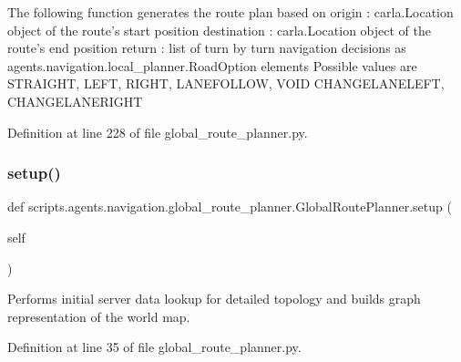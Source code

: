 \begin{DoxyVerb}The following function generates the route plan based on
origin      : carla.Location object of the route's start position
destination : carla.Location object of the route's end position
return      : list of turn by turn navigation decisions as
agents.navigation.local_planner.RoadOption elements
Possible values are STRAIGHT, LEFT, RIGHT, LANEFOLLOW, VOID
CHANGELANELEFT, CHANGELANERIGHT
\end{DoxyVerb}
 

Definition at line 228 of file global\+\_\+route\+\_\+planner.\+py.

\mbox{\label{classscripts_1_1agents_1_1navigation_1_1global__route__planner_1_1GlobalRoutePlanner_a1d5a29b9a1796bc9e1eaab60bc82f0f3}} 
\subsubsection{\texorpdfstring{setup()}{setup()}}
{\footnotesize\ttfamily def scripts.\+agents.\+navigation.\+global\+\_\+route\+\_\+planner.\+Global\+Route\+Planner.\+setup (\begin{DoxyParamCaption}\item[{}]{self }\end{DoxyParamCaption})}

\begin{DoxyVerb}Performs initial server data lookup for detailed topology
and builds graph representation of the world map.
\end{DoxyVerb}
 

Definition at line 35 of file global\+\_\+route\+\_\+planner.\+py.

\mbox{\label{classscripts_1_1agents_1_1navigation_1_1global__route__planner_1_1GlobalRoutePlanner_a0e1e3890e3adafbbb3acdb213c3077ff}} 
